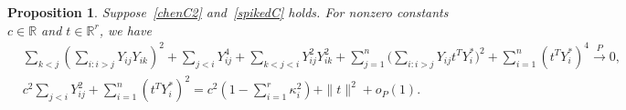 \documentclass[3p]{elsarticle}
\DeclareMathOperator{\mytr}{tr}
\theoremstyle{plain}
\newtheorem{proposition}{\quad\quad Proposition}
\theoremstyle{definition}
\theoremstyle{remark}
\begin{document}
\begin{proposition}\label{proposition:jxz}
    Suppose~\eqref{chenC2} and~\eqref{spikedC} holds.
    For nonzero constants $c\in\mathbb{R}$ and $t\in\mathbb{R}^r$,
    we have
    \begin{align}
    \label{lemma2R1}
        &\sum_{k<j}(\sum_{i:i>j}Y_{ij} Y_{ik})^2
        +\sum_{j<i}Y_{ij}^4
        +\sum_{k<j<i}Y_{ij}^2 Y_{ik}^2
        +\sum_{j=1}^n \big(\sum_{i:i>j} Y_{ij}t^T Y_i^*\big)^2
        +\sum_{i=1}^n (t^T Y_i^*)^4 \xrightarrow{P}0,
        \\
        &c^2 \sum_{j<i}Y_{ij}^2+\sum_{i=1}^n (t^T Y_i^*)^2=c^2(1-\sum_{i=1}^r \kappa_i^2)+\|t\|^2+o_P(1).\label{lemma2Rn}
    \end{align}
\end{proposition}
\end{document}
